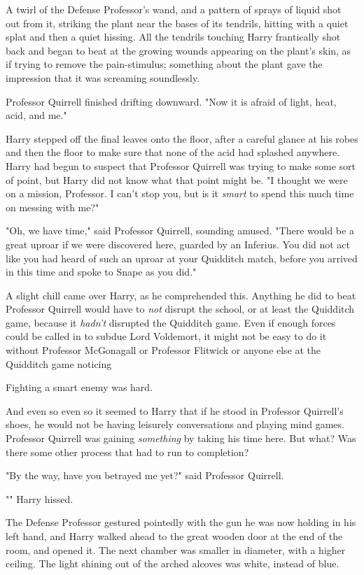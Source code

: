 A twirl of the Defense Professor's wand, and a pattern of sprays of liquid shot
out from it, striking the plant near the bases of its tendrils, hitting with a
quiet splat and then a quiet hissing. All the tendrils touching Harry
frantically shot back and began to beat at the growing wounds appearing on the
plant's skin, as if trying to remove the pain-stimulus; something about the
plant gave the impression that it was screaming soundlessly.

Professor Quirrell finished drifting downward. "Now it is afraid of light,
heat, acid, and me."

Harry stepped off the final leaves onto the floor, after a careful glance at
his robes and then the floor to make sure that none of the acid had splashed
anywhere. Harry had begun to suspect that Professor Quirrell was trying to make
some sort of point, but Harry did not know what that point might be. "I thought
we were on a mission, Professor. I can't stop you, but is it \emph{smart} to
spend this much time on messing with me?"

"Oh, we have time," said Professor Quirrell, sounding amused. "There would be a
great uproar if we were discovered here, guarded by an Inferius. You did not
act like you had heard of such an uproar at your Quidditch match, before you
arrived in this time and spoke to Snape as you did."

A slight chill came over Harry, as he comprehended this. Anything he did to
beat Professor Quirrell would have to \emph{not} disrupt the school, or at
least the Quidditch game, because it \emph{hadn't} disrupted the Quidditch
game. Even if enough forces could be called in to subdue Lord Voldemort, it
might not be easy to do it without Professor McGonagall or Professor Flitwick
or anyone else at the Quidditch game noticing{\el}

Fighting a smart enemy was hard.

And even so{\el} even so it seemed to Harry that if he stood in Professor
Quirrell's shoes, he would not be having leisurely conversations and playing
mind games. Professor Quirrell was gaining \emph{something} by taking his time
here. But what? Was there some other process that had to run to completion?

"By the way, have you betrayed me yet?" said Professor Quirrell.

"" Harry hissed.

The Defense Professor gestured pointedly with the gun he was now holding in his
left hand, and Harry walked ahead to the great wooden door at the end of the
room, and opened it.
\sbreak
The next chamber was smaller in diameter, with a higher ceiling. The light
shining out of the arched alcoves was white, instead of blue.


